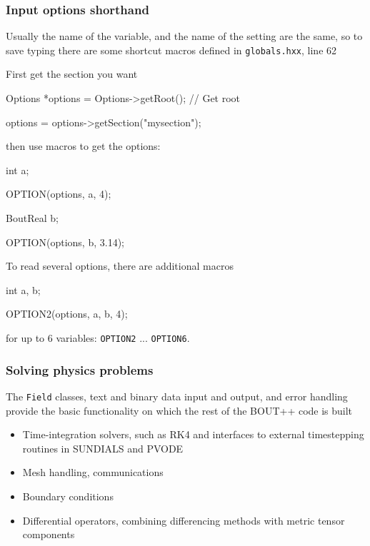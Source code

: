 \documentclass{beamer}
\begin{document}
\begin{frame}
  \frametitle{Input options shorthand}
  
  Usually the name of the variable, and the name of the setting are the same,
  so to save typing there are some shortcut macros defined in \texttt{globals.hxx}, line 62
  
  First get the section you want
  \begin{semiverbatim}
    Options *options = Options->getRoot(); // Get root
    
    options = options->getSection("mysection");
  \end{semiverbatim}
  then use macros to get the options:
  \begin{semiverbatim}
    int a;

    OPTION(options, a, 4);

    BoutReal b;

    OPTION(options, b, 3.14);
  \end{semiverbatim}
  
  To read several options, there are additional macros
  \begin{semiverbatim}
    int a, b;

    OPTION2(options, a, b, 4);
  \end{semiverbatim}
  for up to 6 variables: \texttt{OPTION2} ... \texttt{OPTION6}.
\end{frame}

\begin{frame}
  \frametitle{Solving physics problems}
  The \texttt{Field} classes, text and binary data input and output, and
  error handling provide the basic functionality on which the
  rest of the BOUT++ code is built
  \begin{itemize}
  \item Time-integration solvers, such as RK4 and interfaces to external timestepping routines in SUNDIALS and PVODE
  \item Mesh handling, communications
  \item Boundary conditions
  \item Differential operators, combining differencing methods with
    metric tensor components
  \end{itemize}
\end{frame}
\end{document}
